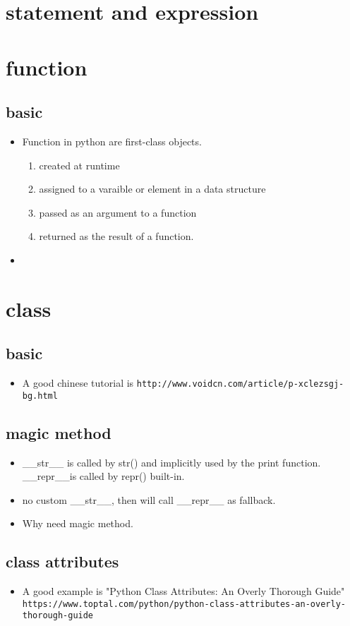 \documentclass[a4paper,12pt,twoside]{book}
\begin{document}
\chapter{statement and expression}
\chapter{function}
\section{basic}
\begin{itemize}
	\item Function in python are first-class objects.
	\begin{enumerate}
		\item created at runtime
		\item assigned to a varaible or element in a data structure
		\item passed as an argument to a function
		\item returned as the result of a function.
	\end{enumerate}
	\item 
\end{itemize}
\chapter{class}
\section{basic}
\begin{itemize}
	\item A good chinese tutorial is \verb!http://www.voidcn.com/article/p-xclezsgj-bg.html!
	
\end{itemize}
\section{magic method}
\begin{itemize}
	\item \_\_str\_\_ is called by str() and implicitly used by the print function. \_\_repr\_\_is called by repr() built-in. 
	\item no custom \_\_str\_\_, then will call \_\_repr\_\_ as fallback. 
	\item Why need magic method. 
\end{itemize}
\section{class attributes}
\begin{itemize}
	
	\item A good example is "Python Class Attributes: An Overly Thorough Guide" \verb!https://www.toptal.com/python/python-class-attributes-an-overly-thorough-guide!
\end{itemize}
\end{document}
